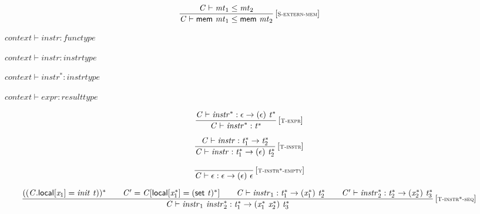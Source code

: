 $$
\begin{array}{@{}c@{}}\displaystyle
\frac{
{\mathit{C}} \vdash {\mathit{mt}}_{{1}} \leq {\mathit{mt}}_{{2}}
}{
{\mathit{C}} \vdash \mathsf{mem}~{\mathit{mt}}_{{1}} \leq \mathsf{mem}~{\mathit{mt}}_{{2}}
} \, {[\textsc{\scriptsize S{-}extern{-}mem}]}
\qquad
\end{array}
$$

\vspace{1ex}

$\boxed{{\mathit{context}} \vdash {\mathit{instr}} : {\mathit{functype}}}$

$\boxed{{\mathit{context}} \vdash {\mathit{instr}} : {\mathit{instrtype}}}$

$\boxed{{\mathit{context}} \vdash {{\mathit{instr}}^\ast} : {\mathit{instrtype}}}$

$\boxed{{\mathit{context}} \vdash {\mathit{expr}} : {\mathit{resulttype}}}$

\vspace{1ex}

$$
\begin{array}{@{}c@{}}\displaystyle
\frac{
{\mathit{C}} \vdash {{\mathit{instr}}^\ast} : \epsilon \rightarrow (\epsilon)~{{\mathit{t}}^\ast}
}{
{\mathit{C}} \vdash {{\mathit{instr}}^\ast} : {{\mathit{t}}^\ast}
} \, {[\textsc{\scriptsize T{-}expr}]}
\qquad
\end{array}
$$

\vspace{1ex}

$$
\begin{array}{@{}c@{}}\displaystyle
\frac{
{\mathit{C}} \vdash {\mathit{instr}} : {{\mathit{t}}_{{1}}^\ast} \rightarrow {{\mathit{t}}_{{2}}^\ast}
}{
{\mathit{C}} \vdash {\mathit{instr}} : {{\mathit{t}}_{{1}}^\ast} \rightarrow (\epsilon)~{{\mathit{t}}_{{2}}^\ast}
} \, {[\textsc{\scriptsize T{-}instr}]}
\qquad
\end{array}
$$

$$
\begin{array}{@{}c@{}}\displaystyle
\frac{
}{
{\mathit{C}} \vdash \epsilon : \epsilon \rightarrow (\epsilon)~\epsilon
} \, {[\textsc{\scriptsize T{-}instr*{-}empty}]}
\qquad
\end{array}
$$

$$
\begin{array}{@{}c@{}}\displaystyle
\frac{
(({\mathit{C}}.\mathsf{local}[{\mathit{x}}_{{1}}] = {\mathit{init}}~{\mathit{t}}))^\ast
 \qquad
{\mathit{C}'} = {\mathit{C}}[\mathsf{local}[{{\mathit{x}}_{{1}}^\ast}] = {(\mathsf{set}~{\mathit{t}})^\ast}]
 \qquad
{\mathit{C}} \vdash {\mathit{instr}}_{{1}} : {{\mathit{t}}_{{1}}^\ast} \rightarrow ({{\mathit{x}}_{{1}}^\ast})~{{\mathit{t}}_{{2}}^\ast}
 \qquad
{\mathit{C}'} \vdash {{\mathit{instr}}_{{2}}^\ast} : {{\mathit{t}}_{{2}}^\ast} \rightarrow ({{\mathit{x}}_{{2}}^\ast})~{{\mathit{t}}_{{3}}^\ast}
}{
{\mathit{C}} \vdash {\mathit{instr}}_{{1}}~{{\mathit{instr}}_{{2}}^\ast} : {{\mathit{t}}_{{1}}^\ast} \rightarrow ({{\mathit{x}}_{{1}}^\ast}~{{\mathit{x}}_{{2}}^\ast})~{{\mathit{t}}_{{3}}^\ast}
} \, {[\textsc{\scriptsize T{-}instr*{-}seq}]}
\qquad
\end{array}
$$

